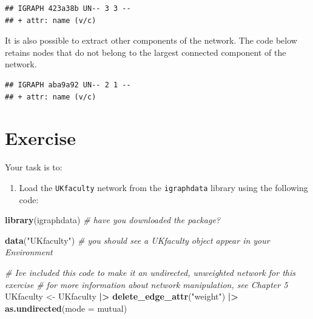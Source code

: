 \documentclass[
]{book}
\newenvironment{Shaded}{\begin{snugshade}}{\end{snugshade}}
\newcommand{\AttributeTok}[1]{\textcolor[rgb]{0.13,0.29,0.53}{#1}}
\newcommand{\CommentTok}[1]{\textcolor[rgb]{0.56,0.35,0.01}{\textit{#1}}}
\newcommand{\FunctionTok}[1]{\textcolor[rgb]{0.13,0.29,0.53}{\textbf{#1}}}
\newcommand{\NormalTok}[1]{#1}
\newcommand{\OtherTok}[1]{\textcolor[rgb]{0.56,0.35,0.01}{#1}}
\newcommand{\SpecialCharTok}[1]{\textcolor[rgb]{0.81,0.36,0.00}{\textbf{#1}}}
\newcommand{\StringTok}[1]{\textcolor[rgb]{0.31,0.60,0.02}{#1}}
\providecommand{\tightlist}{%
  \setlength{\itemsep}{0pt}\setlength{\parskip}{0pt}}
\begin{document}
\begin{verbatim}
## IGRAPH 423a38b UN-- 3 3 -- 
## + attr: name (v/c)
\end{verbatim}

It is also possible to extract other components of the network. The code below retains nodes that do not belong to the largest connected component of the network.

\begin{Shaded}
\end{Shaded}

\begin{verbatim}
## IGRAPH aba9a92 UN-- 2 1 -- 
## + attr: name (v/c)
\end{verbatim}

\section{Exercise}\label{exercise-4}

Your task is to:

\begin{enumerate}
\def\labelenumi{\arabic{enumi}.}
\tightlist
\item
  Load the \texttt{UKfaculty} network from the \texttt{igraphdata} library using the following code:
\end{enumerate}

\begin{Shaded}
\begin{Highlighting}[]
\FunctionTok{library}\NormalTok{(igraphdata) }\CommentTok{\# have you downloaded the package? }

\FunctionTok{data}\NormalTok{(}\StringTok{"UKfaculty"}\NormalTok{) }\CommentTok{\# you should see a UKfaculty object appear in your Environment}

\CommentTok{\# I\textquotesingle{}ve included this code to make it an undirected, unweighted network for this exercise}
\CommentTok{\# for more information about network manipulation, see Chapter 5}
\NormalTok{UKfaculty }\OtherTok{\textless{}{-}}\NormalTok{ UKfaculty }\SpecialCharTok{|\textgreater{}} \FunctionTok{delete\_edge\_attr}\NormalTok{(}\StringTok{"weight"}\NormalTok{) }\SpecialCharTok{|\textgreater{}} \FunctionTok{as.undirected}\NormalTok{(}\AttributeTok{mode =} \StringTok{\textquotesingle{}mutual\textquotesingle{}}\NormalTok{)}
\end{Highlighting}
\end{Shaded}
\end{document}
